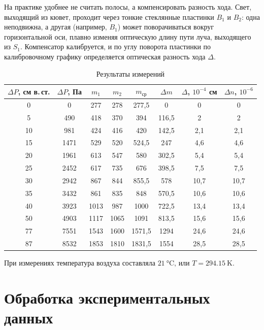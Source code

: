 \documentclass[14pt,a4paper]{extarticle}
\begin{document}
На практике удобнее не считать полосы, а компенсировать разность хода. Свет, выходящий из кювет, проходит через тонкие стеклянные пластинки $B_1$ и $B_2$: одна неподвижна, а другая (например, $B_1$) может поворачиваться вокруг горизонтальной оси, плавно изменяя оптическую длину пути луча, выходящего из $S_1$. Компенсатор калибруется, и по углу поворота пластинки по калибровочному графику определяется оптическая разность хода $\Delta$.
\begin{table}[htbp]
\caption{Результаты измерений}
\label{tab:rt}
\centering
\small
\setlength{\tabcolsep}{4pt}
\begin{tabular}{
S[table-format=2.0]
S[table-format=4.0]
S[table-format=4.0]
S[table-format=4.0]
S[table-format=4.1]
S[table-format=4.1]
S[table-format=2.1]
S[table-format=2.1]
}
\toprule
{$\Delta P$, см в.\,ст.} & {$\Delta P$, Па} & {$m_1$} & {$m_2$} & {$m_{\text{ср}}$} & {$\Delta m$} & {$\Delta$, $10^{-4}$ см} & {$\Delta n$, $10^{-6}$} \\
 & 0 & 277 & 278 & 277,5 & 0 & 0 & 0 \\
5 & 490 & 418 & 370 & 394 & 116,5 & 2 & 2 \\
10 & 981 & 424 & 416 & 420 & 142,5 & 2,1 & 2,1 \\
15 & 1471 & 529 & 520 & 524,5 & 247 & 4,6 & 4,6 \\
20 & 1961 & 613 & 547 & 580 & 302,5 & 5,4 & 5,4 \\
25 & 2452 & 617 & 735 & 676 & 398,5 & 7,5 & 7,5 \\
30 & 2942 & 867 & 844 & 855,5 & 578 & 10,7 & 10,7 \\
35 & 3432 & 861 & 835 & 848 & 570,5 & 10,6 & 10,6 \\
40 & 3923 & 1013 & 987 & 1000 & 722,5 & 13,4 & 13,4 \\
50 & 4903 & 1117 & 1065 & 1091 & 813,5 & 15,6 & 15,6 \\
77 & 7551 & 1543 & 1600 & 1571,5 & 1294 & 24,6 & 24,6 \\
87 & 8532 & 1853 & 1810 & 1831,5 & 1554 & 28,5 & 28,5 \\
\bottomrule
\end{tabular}
\end{table}

При измерениях температура воздуха составляла $\SI{21}{\celsius}$, или $T = \SI{294,15}{\kelvin}$.

\section*{Обработка экспериментальных данных}
\end{document}
